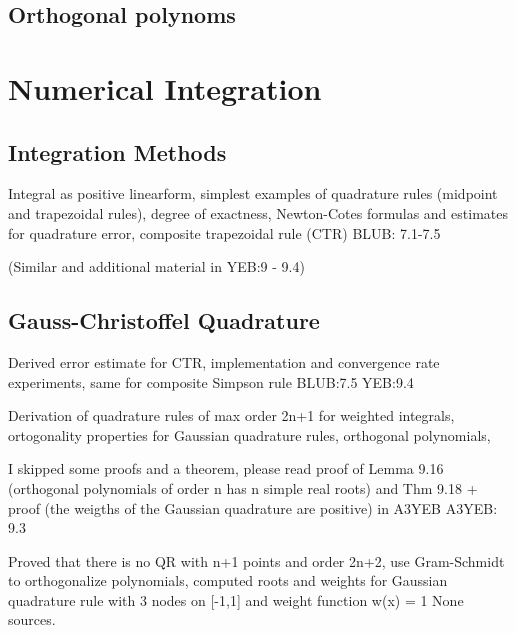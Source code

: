 \documentclass{article}
\theoremstyle{remark}
\begin{document}
\subsection{Orthogonal polynoms}%
\label{sub:orthogonal_polynoms}

\newpage
\section{Numerical Integration}%
\label{sec:numerical_integration}

\subsection{Integration Methods}%
\label{sub:trapezoid_rule}
\begin{tcolorbox}
  Integral as positive linearform, simplest examples of  quadrature rules (midpoint and trapezoidal rules), degree of exactness, Newton-Cotes formulas and estimates for quadrature error, composite trapezoidal rule (CTR)
  BLUB: 7.1-7.5

  (Similar and additional material in YEB:9 - 9.4)
\end{tcolorbox}

\subsection{Gauss-Christoffel Quadrature}%
\label{sub:gauss_christoffel_quadrature}
\begin{tcolorbox}
  Derived error estimate for CTR, implementation and convergence rate experiments, same for composite Simpson rule	
  BLUB:7.5
YEB:9.4
\end{tcolorbox}

\begin{tcolorbox}
  Derivation of quadrature rules of max order 2n+1 for weighted integrals, ortogonality properties for Gaussian quadrature rules, orthogonal polynomials,

I skipped some proofs and a theorem, please read proof of Lemma 9.16 (orthogonal polynomials of order n has n simple real roots)  and Thm 9.18 + proof (the weigths of the Gaussian quadrature are positive) in A3YEB
A3YEB: 9.3

\end{tcolorbox}

\begin{tcolorbox}
  Proved that there is no QR with n+1 points and order 2n+2, use Gram-Schmidt to orthogonalize polynomials, computed roots and weights for Gaussian quadrature rule with 3 nodes on [-1,1] and weight function w(x) = 1
None sources.

\end{tcolorbox}
\end{document}
